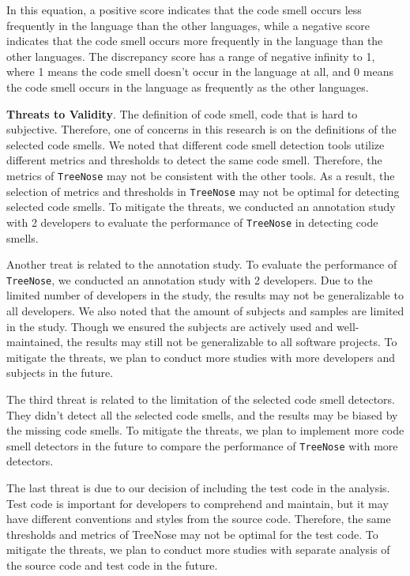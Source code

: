 In this equation, a positive score indicates that the code smell occurs less
frequently in the language than the other languages, while a negative score
indicates that the code smell occurs more frequently in the language than the
other languages. The discrepancy score has a range of negative infinity to 1,
where 1 means the code smell doesn't occur in the language at all, and 0 means
the code smell occurs in the language as frequently as the other languages.




{\bf Threats to Validity}. The definition of code smell, code that is hard to
subjective. Therefore, one of concerns in this research is on the definitions
of the selected code smells. We noted that different code smell detection tools
utilize different metrics and thresholds to detect the same code smell.
Therefore, the metrics of \texttt{TreeNose} may not be consistent with the
other tools. As a result, the selection of metrics and thresholds in
\texttt{TreeNose} may not be optimal for detecting selected code smells. To
mitigate the threats, we conducted an annotation study with 2 developers to
evaluate the performance of \texttt{TreeNose} in detecting code smells.

Another treat is related to the annotation study. To evaluate the performance
of \texttt{TreeNose}, we conducted an annotation study with 2 developers. Due
to the limited number of developers in the study, the results may not be
generalizable to all developers. We also noted that the amount of subjects and
samples are limited in the study. Though we ensured the subjects are actively
used and well-maintained, the results may still not be generalizable to all
software projects. To mitigate the threats, we plan to conduct more studies
with more developers and subjects in the future.

The third threat is related to the limitation of the selected code smell
detectors. They didn't detect all the selected code smells, and the results may
be biased by the missing code smells. To mitigate the threats, we plan to
implement more code smell detectors in the future to compare the performance of
\texttt{TreeNose} with more detectors.

The last threat is due to our decision of including the test code in the
analysis. Test code is important for developers to comprehend and maintain, but
it may have different conventions and styles from the source code. Therefore,
the same thresholds and metrics of TreeNose may not be optimal for the test
code. To mitigate the threats, we plan to conduct more studies with separate
analysis of the source code and test code in the future.
